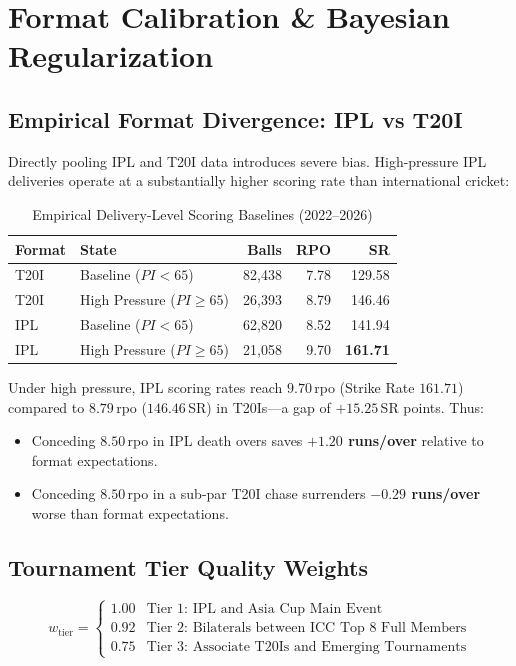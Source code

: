 \documentclass[11pt,a4paper]{article}
\begin{document}
\section{Format Calibration \& Bayesian Regularization}

\subsection{Empirical Format Divergence: IPL vs T20I}
Directly pooling IPL and T20I data introduces severe bias. High-pressure IPL deliveries operate at a substantially higher scoring rate than international cricket:

\begin{table}[htbp]
\centering
\small
\caption{Empirical Delivery-Level Scoring Baselines (2022--2026)}
\label{tab:context_baselines}
\begin{tabularx}{\linewidth}{l l r r r}
\toprule
\textbf{Format} & \textbf{State} & \textbf{Balls} & \textbf{RPO} & \textbf{SR} \\
\midrule
T20I & Baseline ($PI < 65$) & 82,438 & 7.78 & 129.58 \\
T20I & High Pressure ($PI \ge 65$) & 26,393 & 8.79 & 146.46 \\
IPL & Baseline ($PI < 65$) & 62,820 & 8.52 & 141.94 \\
IPL & High Pressure ($PI \ge 65$) & 21,058 & 9.70 & \textbf{161.71} \\
\bottomrule
\end{tabularx}
\end{table}

Under high pressure, IPL scoring rates reach $9.70$\,rpo (Strike Rate $161.71$) compared to $8.79$\,rpo ($146.46$\,SR) in T20Is---a gap of $+15.25$\,SR points. Thus:
\begin{itemize}[itemsep=1pt]
    \item Conceding $8.50$\,rpo in IPL death overs saves \textbf{$+1.20$ runs/over} relative to format expectations.
    \item Conceding $8.50$\,rpo in a sub-par T20I chase surrenders \textbf{$-0.29$ runs/over} worse than format expectations.
\end{itemize}

\subsection{Tournament Tier Quality Weights}
\begin{equation}
w_{\text{tier}} = \begin{cases}
1.00 & \text{Tier 1: IPL and Asia Cup Main Event} \\
0.92 & \text{Tier 2: Bilaterals between ICC Top 8 Full Members} \\
0.75 & \text{Tier 3: Associate T20Is and Emerging Tournaments}
\end{cases}
\end{equation}
\end{document}
